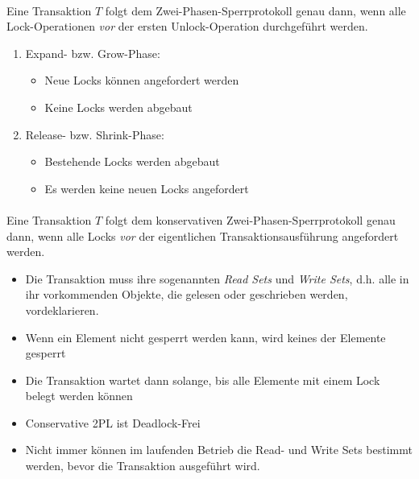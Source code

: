 \begin{frame}{\insertsection}
	\framesubtitle{\insertsubsection}
\begin{definition}[Basic 2PL]
Eine Transaktion $T$ folgt dem Zwei-Phasen-Sperrprotokoll genau dann, wenn alle Lock-Operationen \textit{vor} der ersten Unlock-Operation durchgeführt werden.
\end{definition}

\begin{enumerate}
\item Expand- bzw. Grow-Phase: 
\begin{itemize}
\item Neue Locks können angefordert werden 
\item Keine Locks werden abgebaut 
\end{itemize}
\item Release- bzw. Shrink-Phase: 
\begin{itemize}
\item Bestehende Locks werden abgebaut 
\item Es werden keine neuen Locks angefordert
\end{itemize}
\end{enumerate}
\end{frame}

\begin{frame}{\insertsection}
	\framesubtitle{\insertsubsection}
\begin{definition}[Conservative 2PL]
Eine Transaktion $T$ folgt dem konservativen Zwei-Phasen-Sperrprotokoll genau dann, wenn alle Locks \textit{vor} der eigentlichen Transaktionsausführung angefordert werden.
\end{definition}
\begin{itemize}
\item Die Transaktion muss ihre sogenannten \textit{Read Sets} und \textit{Write Sets}, d.h. alle in ihr vorkommenden Objekte, die gelesen oder geschrieben werden, vordeklarieren. 
\item Wenn ein Element nicht gesperrt werden kann, wird keines der Elemente gesperrt 
\item Die Transaktion wartet dann solange, bis alle Elemente mit einem Lock belegt werden können
\item Conservative 2PL ist Deadlock-Frei 
\item \alert{Nicht immer können im laufenden Betrieb die Read- und Write Sets bestimmt werden, bevor die Transaktion ausgeführt wird.}
\end{itemize}
\end{frame}


